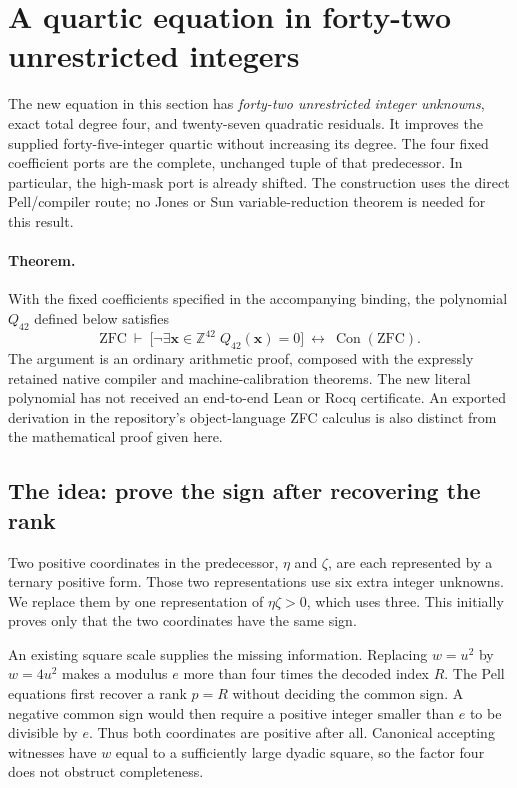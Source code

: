\section{A quartic equation in forty-two unrestricted integers}
\label{sec:quartic42}

The new equation in this section has \emph{forty-two unrestricted integer
unknowns}, exact total degree four, and twenty-seven quadratic residuals.
It improves the supplied forty-five-integer quartic without increasing its
degree. The four fixed coefficient ports are the complete, unchanged tuple
of that predecessor. In particular, the high-mask port is already shifted.
The construction uses the direct Pell/compiler route; no Jones or Sun
variable-reduction theorem is needed for this result.

\paragraph{Theorem.}
With the fixed coefficients specified in the accompanying binding, the
polynomial $Q_{42}$ defined below satisfies
\[
 \mathrm{ZFC}\ \vdash\
 \bigl[\neg\exists\boldsymbol{x}\in\mathbb Z^{42}
                \;Q_{42}(\boldsymbol{x})=0\bigr]
 \ \longleftrightarrow\ \operatorname{Con}(\mathrm{ZFC}).
\]
The argument is an ordinary arithmetic proof, composed with the expressly
retained native compiler and machine-calibration theorems. The new literal
polynomial has not received an end-to-end Lean or Rocq certificate. An
exported derivation in the repository's object-language ZFC calculus is
also distinct from the mathematical proof given here.

\subsection{The idea: prove the sign after recovering the rank}

Two positive coordinates in the predecessor, $\eta$ and $\zeta$, are each
represented by a ternary positive form. Those two representations use six
extra integer unknowns. We replace them by one representation of
$\eta\zeta>0$, which uses three. This initially proves only that the two
coordinates have the same sign.

An existing square scale supplies the missing information. Replacing
$w=u^2$ by $w=4u^2$ makes a modulus $e$ more than four times the decoded
index $R$. The Pell equations first recover a rank $p=R$ without deciding
the common sign. A negative common sign would then require a positive
integer smaller than $e$ to be divisible by $e$. Thus both coordinates
are positive after all. Canonical accepting witnesses have $w$ equal to
a sufficiently large dyadic square, so the factor four does not obstruct
completeness.

